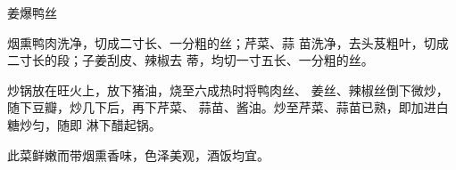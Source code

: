 \begin{recipe}{姜爆鸭丝}

\ingredients



\cooking

\step 	烟熏鸭肉洗净，切成二寸长、一分粗的丝；芹菜、蒜 苗洗净，去头芨粗叶，切成二寸长的段；子姜刮皮、辣椒去 蒂，均切一寸五长、一分粗的丝。

\step 	炒锅放在旺火上，放下猪油，烧至六成热时将鸭肉丝、 姜丝、辣椒丝倒下微炒，随下豆瓣，炒几下后，再下芹菜、 蒜苗、酱油。炒至芹菜、蒜苗已熟，即加进白糖炒匀，随即 淋下醋起锅。

\notes

此菜鲜嫩而带烟熏香味，色泽美观，酒饭均宜。

\end{recipe}

